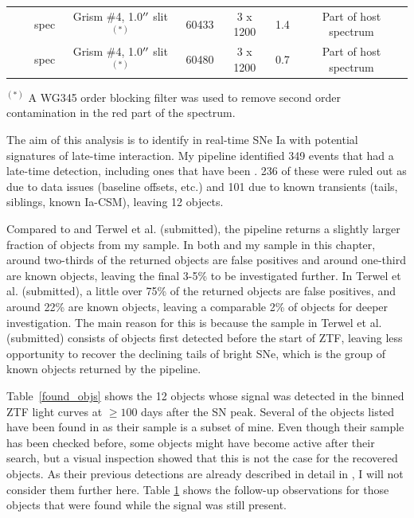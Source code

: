 \documentclass[a4paper,oneside,12pt, class=Latex/Classes/PhDthesisPSnPDF, crop=false]{standalone}
\begin{document}
\begin{table}
{\begin{tabular}{cccccccc}
        & & spec & Grism \#4, 1.0$^{\prime\prime}$ slit $^{(*)}$ & 60433 & 3 x 1200 & 1.4 & Part of host spectrum\\
        & & spec & Grism \#4, 1.0$^{\prime\prime}$ slit $^{(*)}$ & 60480 & 3 x 1200 & 0.7 & Part of host spectrum\\
        \hline
    \end{tabular}
    }    
    \begin{flushleft}
        $^{(*)}$ A WG345 order blocking filter was used to remove second order contamination in the red part of the spectrum.
    \end{flushleft}
    \label{followups}
\end{table}

The aim of this analysis is to identify in real-time SNe Ia with potential signatures of late-time interaction. My pipeline identified 349 events that had a late-time detection, including ones that have been \citet{Terwel_2024_paper1}. 236 of these were ruled out as due to data issues (baseline offsets, etc.) and 101 due to known transients (tails, siblings, known Ia-CSM), leaving 12 objects.

Compared to \citet{Terwel_2024_paper1} and Terwel et al. (submitted), the pipeline returns a slightly larger fraction of objects from my sample. In both \citet{Terwel_2024_paper1} and my sample in this chapter, around two-thirds of the returned objects are false positives and around one-third are known objects, leaving the final 3-5\% to be investigated further. In Terwel et al. (submitted), a little over 75\% of the returned objects are false positives, and around 22\% are known objects, leaving a comparable 2\% of objects for deeper investigation. The main reason for this is because the sample in Terwel et al. (submitted) consists of objects first detected before the start of ZTF, leaving less opportunity to recover the declining tails of bright SNe, which is the group of known objects returned by the pipeline.

Table~\ref{found_objs} shows the 12 objects whose signal was detected in the binned ZTF light curves at $\geq100$ days after the SN peak. Several of the objects listed have been found in \citet{Terwel_2024_paper1} as their sample is a subset of mine. Even though their sample has been checked before, some objects might have become active after their search, but a visual inspection showed that this is not the case for the recovered objects. As their previous detections are already described in detail in \citet{Terwel_2024_paper1}, I will not consider them further here. Table \ref{followups} shows the follow-up observations for those objects that were found while the signal was still present.
\end{document}
